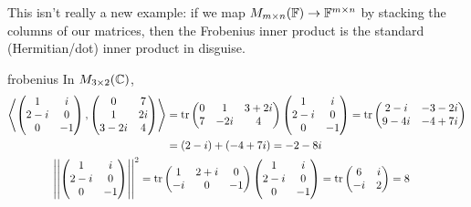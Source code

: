 This isn't really a new example: if we map $M_{m\times n}(\mathbb{F})\to\mathbb{F}^{m\times n}$ by stacking the columns of our matrices, then the Frobenius inner product is the standard (Hermitian/dot) inner product in disguise.


\begin{example}{}{frobenius}
	In $M_{3\times 2}(\mathbb{C})$,
	\begin{gather*}
		\begin{aligned}
			\left\langle 
				\begin{pmatrix}
					1&i\\
					2-i&0\\
					0&-1
				\end{pmatrix}
				,
				\begin{pmatrix}
					0&7\\
					1&2i\\
					3-2i&4
				\end{pmatrix}
			\right\rangle
			&=\operatorname{tr}
			\begin{pmatrix}
				0&1&3+2i\\
				7&-2i&4
			\end{pmatrix}
			\begin{pmatrix}
				1&i\\
				2-i&0\\
				0&-1
			\end{pmatrix}
			=\operatorname{tr}
			\begin{pmatrix}
				2-i&-3-2i\\
				9-4i&-4+7i
			\end{pmatrix}\\
			&=(2-i)+(-4+7i) =-2-8i
		\end{aligned}\\
		\begin{aligned}
			\left| \left| 
				\begin{pmatrix}
					1&i\\
					2-i&0\\
					0&-1
				\end{pmatrix}
			\right|\right|^2
			&=\operatorname{tr}
			\begin{pmatrix}
				1&2+i&0\\
				-i&0&-1
			\end{pmatrix}
			\begin{pmatrix}
				1&i\\
				2-i&0\\
				0&-1
			\end{pmatrix}
			=\operatorname{tr}
			\begin{pmatrix}
				6&i\\
				-i&2
			\end{pmatrix}
			=8
		\end{aligned}
	\end{gather*}
\end{example}


